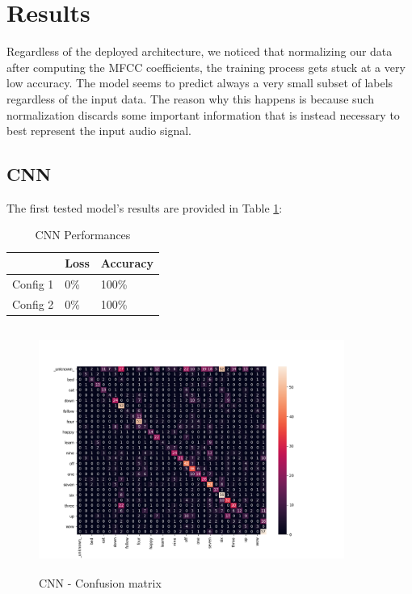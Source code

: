 
\section{Results}
\label{sec:results}

\noindent Regardless of the deployed architecture, we noticed that normalizing our data after computing the MFCC coefficients, the training process gets stuck at a very low accuracy. The model seems to predict always a very small subset of labels regardless of the input data. The reason why this happens is because such normalization discards some important information that is instead necessary to best represent the input audio signal.

\subsection{\textbf{CNN}}
The first tested model's results are provided in Table \ref{table:cnn_performances}:\\
\begin{table}[h!]
\centering
\begin{tabular}{ p{1.5cm}|p{1.5cm}|p{1.5cm}| }
 \hline
   & Loss & Accuracy\\
\hline
Config 1 & 0\% & 100\%  \\
Config 2 & 0\% & 100\% \\
\hline
\end{tabular}
\caption{CNN Performances}
\label{table:cnn_performances}
\end{table}

\begin{figure}[h]
			\centering
	    	\includegraphics[width=10cm, height=8cm]{conf_matrix_cnn_dii_cm}
	    	\caption{CNN - Confusion matrix}
	    	\label{fig:conf_matrix_cnn}
\end{figure} 




